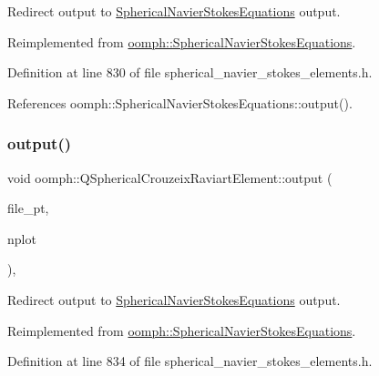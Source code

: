 Redirect output to \hyperlink{classoomph_1_1SphericalNavierStokesEquations}{Spherical\+Navier\+Stokes\+Equations} output. 



Reimplemented from \hyperlink{classoomph_1_1SphericalNavierStokesEquations_a76ad2e32bc8d2efa6242e78ea66076ed}{oomph\+::\+Spherical\+Navier\+Stokes\+Equations}.



Definition at line 830 of file spherical\+\_\+navier\+\_\+stokes\+\_\+elements.\+h.



References oomph\+::\+Spherical\+Navier\+Stokes\+Equations\+::output().

\mbox{\label{classoomph_1_1QSphericalCrouzeixRaviartElement_a46b94f33217c9d82921055347255b4b5}} 
\subsubsection{\texorpdfstring{output()}{output()}\hspace{0.1cm}{\footnotesize\ttfamily [4/4]}}
{\footnotesize\ttfamily void oomph\+::\+Q\+Spherical\+Crouzeix\+Raviart\+Element\+::output (\begin{DoxyParamCaption}\item[{F\+I\+LE $\ast$}]{file\+\_\+pt,  }\item[{const unsigned \&}]{nplot }\end{DoxyParamCaption})\hspace{0.3cm}{\ttfamily [inline]}, {\ttfamily [virtual]}}



Redirect output to \hyperlink{classoomph_1_1SphericalNavierStokesEquations}{Spherical\+Navier\+Stokes\+Equations} output. 



Reimplemented from \hyperlink{classoomph_1_1SphericalNavierStokesEquations_afd0fd2912515b6c23142046c5c200640}{oomph\+::\+Spherical\+Navier\+Stokes\+Equations}.



Definition at line 834 of file spherical\+\_\+navier\+\_\+stokes\+\_\+elements.\+h.



